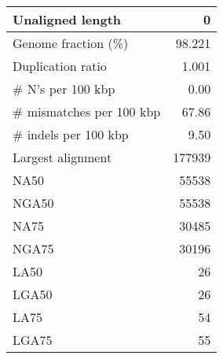 \documentclass[12pt,a4paper]{article}
\begin{document}
\begin{table}[ht]
\begin{center}
\begin{tabular}{|l*{1}{|r}|}
Unaligned length & 0 \\ \hline
Genome fraction (\%) & 98.221 \\ \hline
Duplication ratio & 1.001 \\ \hline
\# N's per 100 kbp & 0.00 \\ \hline
\# mismatches per 100 kbp & 67.86 \\ \hline
\# indels per 100 kbp & 9.50 \\ \hline
Largest alignment & 177939 \\ \hline
NA50 & 55538 \\ \hline
NGA50 & 55538 \\ \hline
NA75 & 30485 \\ \hline
NGA75 & 30196 \\ \hline
LA50 & 26 \\ \hline
LGA50 & 26 \\ \hline
LA75 & 54 \\ \hline
LGA75 & 55 \\ \hline
\end{tabular}
\end{center}
\end{table}
\end{document}
